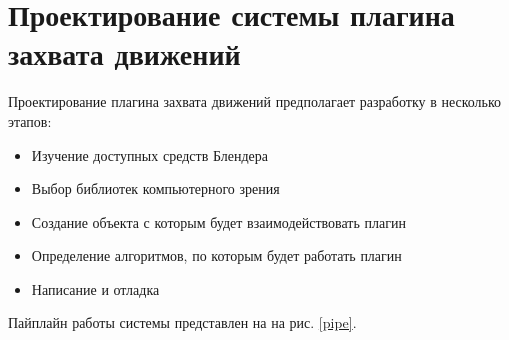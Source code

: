 \section{Проектирование системы плагина захвата движений}

Проектирование плагина захвата движений предполагает разработку в несколько этапов:
\begin{itemize}
	\item Изучение доступных средств Блендера
	\item Выбор библиотек компьютерного зрения
	\item Создание объекта с которым будет взаимодействовать плагин
	\item Определение алгоритмов, по которым будет работать плагин
	\item Написание и отладка
\end{itemize}

Пайплайн работы системы представлен на на рис. \ref{pipe}.
